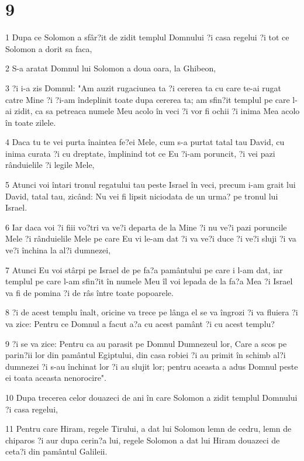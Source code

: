 \chapter{9}

\par 1 Dupa ce Solomon a sfâr?it de zidit templul Domnului ?i casa regelui ?i tot ce Solomon a dorit sa faca,
\par 2 S-a aratat Domnul lui Solomon a doua oara, la Ghibeon,
\par 3 ?i i-a zis Domnul: "Am auzit rugaciunea ta ?i cererea ta cu care te-ai rugat catre Mine ?i ?i-am îndeplinit toate dupa cererea ta; am sfin?it templul pe care l-ai zidit, ca sa petreaca numele Meu acolo în veci ?i vor fi ochii ?i inima Mea acolo în toate zilele.
\par 4 Daca tu te vei purta înaintea fe?ei Mele, cum s-a purtat tatal tau David, cu inima curata ?i cu dreptate, împlinind tot ce Eu ?i-am poruncit, ?i vei pazi rânduielile ?i legile Mele,
\par 5 Atunci voi întari tronul regatului tau peste Israel în veci, precum i-am grait lui David, tatal tau, zicând: Nu vei fi lipsit niciodata de un urma? pe tronul lui Israel.
\par 6 Iar daca voi ?i fiii vo?tri va ve?i departa de la Mine ?i nu ve?i pazi poruncile Mele ?i rânduielile Mele pe care Eu vi le-am dat ?i va ve?i duce ?i ve?i sluji ?i va ve?i închina la al?i dumnezei,
\par 7 Atunci Eu voi stârpi pe Israel de pe fa?a pamântului pe care i l-am dat, iar templul pe care l-am sfin?it în numele Meu îl voi lepada de la fa?a Mea ?i Israel va fi de pomina ?i de râs între toate popoarele.
\par 8 ?i de acest templu înalt, oricine va trece pe lânga el se va îngrozi ?i va fluiera ?i va zice: Pentru ce Domnul a facut a?a cu acest pamânt ?i cu acest templu?
\par 9 ?i se va zice: Pentru ca au parasit pe Domnul Dumnezeul lor, Care a scos pe parin?ii lor din pamântul Egiptului, din casa robiei ?i au primit în schimb al?i dumnezei ?i s-au închinat lor ?i au slujit lor; pentru aceasta a adus Domnul peste ei toata aceasta nenorocire".
\par 10 Dupa trecerea celor douazeci de ani în care Solomon a zidit templul Domnului ?i casa regelui,
\par 11 Pentru care Hiram, regele Tirului, a dat lui Solomon lemn de cedru, lemn de chiparos ?i aur dupa cerin?a lui, regele Solomon a dat lui Hiram douazeci de ceta?i din pamântul Galileii.
